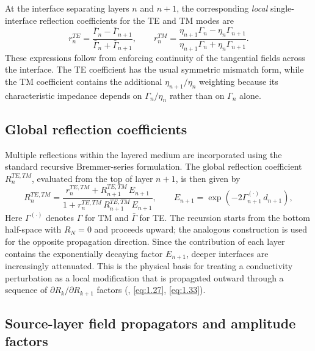 \documentclass[12pt]{report}
\begin{document}
At the interface separating layers \(n\) and \(n+1\), the corresponding
\emph{local} single-interface reflection coefficients for the TE and TM
modes are
\begin{equation}
    r_n^{TE} = \frac{\bar\Gamma_n - \bar\Gamma_{n+1}}{\bar\Gamma_n + \bar\Gamma_{n+1}},
    \qquad
    r_n^{TM} = \frac{\eta_{n+1}\Gamma_n - \eta_n\Gamma_{n+1}}
                    {\eta_{n+1}\Gamma_n + \eta_n\Gamma_{n+1}}.
    \label{eq:ch3-local-refl}
\end{equation}
These expressions follow from enforcing continuity of the tangential
fields across the interface. The TE coefficient has the usual symmetric
mismatch form, while the TM coefficient contains the additional
\(\eta_{n+1}/\eta_n\) weighting because its characteristic impedance
depends on \(\Gamma_n/\eta_n\) rather than on \(\Gamma_n\) alone.

\subsection{Global reflection coefficients}
\label{sec:global-refl-ch3}

Multiple reflections within the layered medium are incorporated using
the standard recursive Bremmer-series formulation. The global reflection
coefficient \(R_n^{TE,TM}\), evaluated from the top of layer \(n+1\), is
then given by
\begin{equation}
    R_n^{TE,TM} =
        \frac{r_n^{TE,TM} + R_{n+1}^{TE,TM}\,E_{n+1}}
             {1 + r_n^{TE,TM}\,R_{n+1}^{TE,TM}\,E_{n+1}},
    \qquad
    E_{n+1} = \exp(-2\Gamma_{n+1}^{(\cdot)}\,d_{n+1}),
    \label{eq:ch3-global-refl}
\end{equation}
Here \(\Gamma^{(\cdot)}\) denotes \(\Gamma\) for TM and
\(\bar\Gamma\) for TE. The recursion starts from the bottom half-space
with \(R_N=0\) and proceeds upward; the analogous construction is used for
the opposite propagation direction. Since the contribution of each layer
contains the exponentially decaying factor \(E_{n+1}\), deeper interfaces
are increasingly attenuated. This is the physical basis for treating a
conductivity perturbation as a local modification that is propagated
outward through a sequence of
\(\partial R_k/\partial R_{k+1}\) factors
(, \eqref{eq:1.27}, \eqref{eq:1.33}).

\subsection{Source-layer field propagators and amplitude factors}
\label{sec:propagators-ch3}
\end{document}
